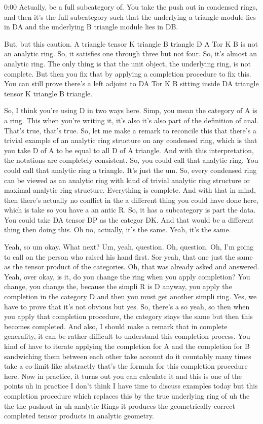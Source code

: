 \begin{unfinished}{0:00}
Actually, be a full subcategory of. You take the push out in condensed rings, and then it's the full subcategory such that the underlying a triangle module lies in DA and the underlying B triangle module lies in DB.

But, but this caution. A triangle tensor K triangle B triangle D A Tor K B is not an analytic ring. So, it satisfies one through three but not four. So, it's almost an analytic ring. The only thing is that the unit object, the underlying ring, is not complete. But then you fix that by applying a completion procedure to fix this. You can still prove there's a left adjoint to DA Tor K B sitting inside DA triangle tensor K triangle B triangle.

So, I think you're using D in two ways here. Simp, you mean the category of A is a ring. This when you're writing it, it's also it's also part of the definition of anal. That's true, that's true. So, let me make a remark to reconcile this that there's a trivial example of an analytic ring structure on any condensed ring, which is that you take D of A to be equal to all D of A triangle. And with this interpretation, the notations are completely consistent. So, you could call that analytic ring. You could call that analytic ring a triangle. It's just the um. So, every condensed ring can be viewed as an analytic ring with kind of trivial analytic ring structure or maximal analytic ring structure. Everything is complete. And with that in mind, then there's actually no conflict in the a different thing you could have done here, which is take so you have a an antic R. So, it has a subcategory is part the data. You could take DA tensor DP as the categor DK. And that would be a different thing then doing this. Oh no, actually, it's the same. Yeah, it's the same.

Yeah, so um okay. What next? Um, yeah, question. Oh, question. Oh, I'm going to call on the person who raised his hand first. Sor yeah, that one just the same as the tensor product of the categories. Oh, that was already asked and answered. Yeah, over okay, is it, do you change the ring when you apply completion? You change, you change the, because the simpli R is D anyway, you apply the completion in the category D and then you must get another simpli ring. Yes, we have to prove that it's not obvious but yes. So, there's a so yeah, so then when you apply that completion procedure, the category stays the same but then this becomes completed. And also, I should make a remark that in complete generality, it can be rather difficult to understand this completion process. You kind of have to iterate applying the completion for A and the completion for B sandwiching them between each other take account do it countably many times take a co-limit like abstractly that's the formula for this completion procedure here. Now in practice, it turns out you can calculate it and this is one of the points uh in practice I don't think I have time to discuss examples today but this completion procedure which replaces this by the true underlying ring of uh the the the pushout in uh analytic Rings it produces the geometrically correct completed tensor products in analytic geometry.


\end{unfinished}
